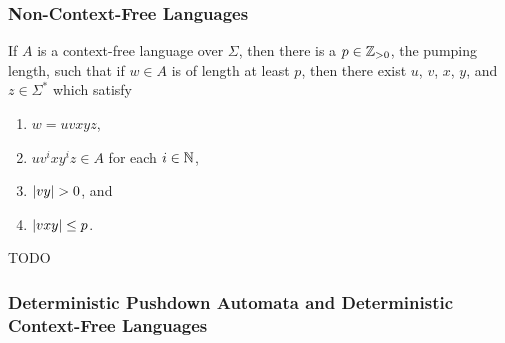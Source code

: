 \subsubsection{Non-Context-Free Languages}

    If \(A\) is a context-free language over \(\Sigma\), then there is a \(p \in
    \mathbb{Z}_{>0}\), the pumping length, such that if \(w \in A\) is of length at
    least \(p\), then there exist \(u\), \(v\), \(x\), \(y\), and \(z \in
    \Sigma^*\) which satisfy
    \begin{enumerate}
        \item \(w = u v x y z\),
        \item \(u v^i x y^i z \in A\) for each \(i \in \mathbb{N}\),
        \item \(\lvert v y\rvert > 0\), and
        \item \(\lvert v x y\rvert \leq p\).
    \end{enumerate}
\Eth
\Bpr
    TODO
\Epr

\subsubsection{Deterministic Pushdown Automata and Deterministic Context-Free
Languages}

\Edc
